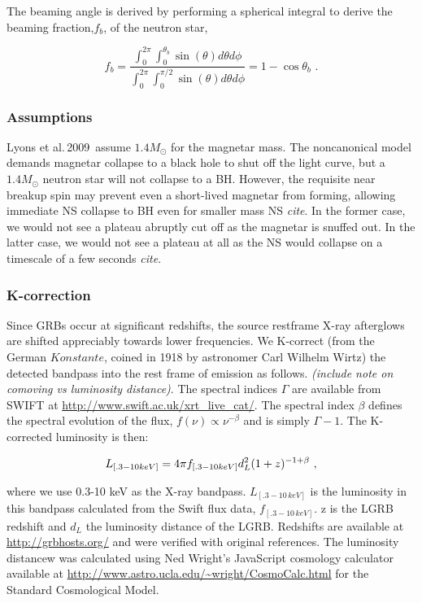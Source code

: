 \documentclass{article}
\begin{document}
The beaming angle is derived by performing a spherical integral to derive the beaming fraction,$f_b$, of the neutron star,

\begin{equation}
f_b=\frac{\int_0^{2\pi} \int_0^{\theta_b} \sin(\theta) d\theta d\phi}{\int_0^{2\pi} \int_0^{\pi/2} \sin(\theta) d\theta d\phi} = 1-\cos{\theta_b}\,\,.
\end{equation}

\subsubsection{Assumptions}

Lyons et al.\,2009\,\cite{Lyons:2009ka} assume $1.4 M_{\odot}$ for the magnetar mass. The noncanonical model demands magnetar collapse to a black hole to shut off the light curve, but a $1.4 M_{\odot}$  neutron star will not collapse to a BH. However, the requisite near breakup spin may prevent even a short-lived magnetar from forming, allowing immediate NS collapse to BH even for smaller mass NS \textit{cite}. In the former case, we would not see a plateau abruptly cut off as the magnetar is snuffed out. In the latter case, we would not see a plateau at all as the NS would collapse on a timescale of a few seconds \textit{cite}.
\hspace{2cm}

\subsubsection{K-correction}
Since GRBs occur at significant redshifts, the source restframe X-ray afterglows are shifted appreciably towards lower frequencies. We K-correct (from the German $Konstante$, coined in 1918 by astronomer Carl Wilhelm Wirtz) the detected bandpass into the rest frame of emission  as follows. \textit{(include note on comoving vs luminosity distance)}. The spectral indices $\Gamma$ are available from SWIFT at \url{http://www.swift.ac.uk/xrt_live_cat/}. The spectral index $\beta$ defines the spectral evolution of the flux, $f(\nu) \propto \nu^{-\beta}$ and is simply $\Gamma -1$. The K-corrected luminosity is then:

\begin{equation} L_{[.3-10 keV]} = 4\pi\* f_{[.3-10 keV]}d_{L}^2  (1+z)^{-1+\beta}\,\,,
\end{equation}

where we use 0.3-10 keV as the X-ray bandpass.  $L_{[.3-10\,keV]}$ is the luminosity in this bandpass calculated from the Swift flux data,  $f_{[.3-10\,keV]}$. z is the LGRB redshift and $d_L$ the luminosity distance of the LGRB. Redshifts are available at \url{http://grbhosts.org/} and were verified with original references. The luminosity distancew was calculated using Ned Wright's JavaScript cosmology calculator available at \url{http://www.astro.ucla.edu/~wright/CosmoCalc.html} for the Standard Cosmological Model.
\end{document}
